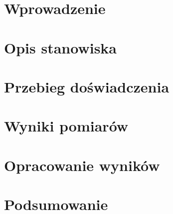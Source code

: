 \documentclass{sprawozdanie-agh}
\begin{document}

\stronatytulowa{}

\section{Wprowadzenie}


\section{Opis stanowiska}

\section{Przebieg doświadczenia}


\section{Wyniki pomiarów}


\section{Opracowanie wyników}
\section{Podsumowanie}
\end{document}
